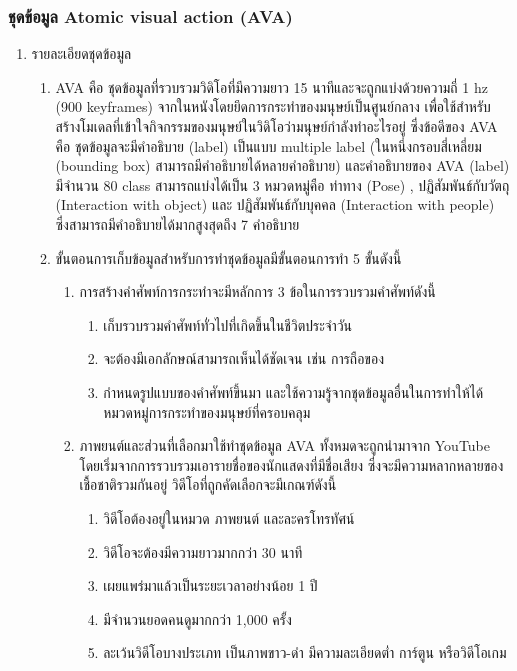 \subsubsection*{ชุดข้อมูล Atomic visual action (AVA)}	
\begin{enumerate}
	\item {รายละเอียดชุดข้อมูล}
	\begin{enumerate}
		\item AVA คือ ชุดข้อมูลที่รวบรวมวิดิโอที่มีความยาว 15 นาทีและจะถูกแบ่งด้วยความถี่ 1 hz (900 keyframes) จากในหนังโดยยึดการกระทำของมนุษย์เป็นศูนย์กลาง เพื่อใช้สำหรับสร้างโมเดลที่เข้าใจกิจกรรมของมนุษย์ในวิดิโอว่ามนุษย์กำลังทำอะไรอยู่ ซึ่งข้อดีของ AVA คือ ชุดข้อมูลจะมีคำอธิบาย (label) เป็นแบบ multiple label (ในหนึ่งกรอบสี่เหลี่ยม (bounding box) สามารถมีคำอธิบายได้หลายคำอธิบาย) และคำอธิบายของ AVA (label) มีจำนวน 80 class สามารถแบ่งได้เป็น 3 หมวดหมู่คือ ท่าทาง (Pose) , ปฏิสัมพันธ์กับวัตถุ (Interaction with object) และ ปฏิสัมพันธ์กับบุคคล (Interaction with people) ซึ่งสามารถมีคำอธิบายได้มากสูงสุดถึง 7 คำอธิบาย
		\item ขั้นตอนการเก็บข้อมูลสำหรับการทำชุดข้อมูลมีขั้นตอนการทำ 5 ขั้นดังนี้
		\begin{enumerate}
			\item การสร้างคำศัพท์การกระทำจะมีหลักการ 3 ข้อในการรวบรวมคำศัพท์ดังนี้
			\begin{enumerate}
				\item เก็บรวบรวมคำศัพท์ทั่วไปที่เกิดขึ้นในชีวิตประจำวัน
				\item จะต้องมีเอกลักษณ์สามารถเห็นได้ชัดเจน เช่น การถือของ
				\item กำหนดรูปแบบของคำศัพท์ขึ้นมา และใช้ความรู้จากชุดข้อมูลอื่นในการทำให้ได้หมวดหมู่การกระทำของมนุษย์ที่ครอบคลุม
			\end{enumerate}
			\item ภาพยนต์และส่วนที่เลือกมาใช้ทำชุดข้อมูล AVA ทั้งหมดจะถูกนำมาจาก YouTube โดยเริ่มจากการรวบรวมเอารายชื่อของนักแสดงที่มีชื่อเสียง
			ซึ่งจะมีความหลากหลายของเชื้อชาติรวมกันอยู่ วิดีโอที่ถูกคัดเลือกจะมีเกณฑ์ดังนี้
			\begin{enumerate}
				\item วิดีโอต้องอยู่ในหมวด ภาพยนต์ และละครโทรทัศน์
				\item วิดีโอจะต้องมีความยาวมากกว่า 30 นาที
				\item เผยแพร่มาแล้วเป็นระยะเวลาอย่างน้อย 1 ปี
				\item มีจำนวนยอดคนดูมากกว่า 1,000 ครั้ง
				\item ละเว้นวิดีโอบางประเภท เป็นภาพขาว-ดำ มีความละเอียดต่ำ การ์ตูน หรือวิดีโอเกม

\end{enumerate}
\end{enumerate}
\end{enumerate}
\end{enumerate}
